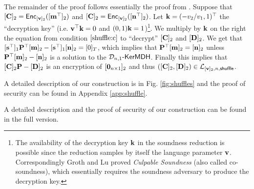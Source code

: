 The remainder of the proof follows essentially the proof from \cite{AC:GroLu07}. Suppose that $[\mathbf{{C}}]_2=\mathsf{Enc}_{[\mathbf{v}]_2}([\mathbf{{m}}^\top]_2)$ and $[\mathbf{{C}}]_2=\mathsf{Enc}_{[\mathbf{v}]_2}([\mathbf{{n}}^\top]_2)$. Let $\mathbf{k}=(-v_2/v_1,1)^\top$ the ``decryption key'' (i.e. $\mathbf{v}^\top\mathbf{k}=0$ and $(0,1)\mathbf{k}=1$)\footnote{The availability of the decryption key $\mathbf{k}$ in the soundness reduction is possible since the reduction samples by itself the language parameter $\mathbf{v}$. Correspondingly Groth and Lu \cite{AC:GroLu07} proved \emph{Culpable Soundness} (also called co-soundness), which essentially requires the soundness adversary to produce the decryption key.}. We multiply by $\mathbf{{k}}$ on the right the equation from condition $\ref{shuffle:c}$ to ``decrypt'' $[\mathbf{{C}}]_2$ and $[\mathbf{{D}}]_2$. We get that
$[\mathbf{s}^\top]_1\mathbf{{P}}^\top[\mathbf{{m}}]_2-[\mathbf{s}^\top]_1[\mathbf{{n}}]_2=[0]_T$, which implies that $\mathbf{{P}}^\top[\mathbf{{m}}]_2=[\mathbf{{n}}]_2$ unless $\mathbf{{P}}^\top[\mathbf{{m}}]_2-[\mathbf{{n}}]_2$ is a solution to the $\mathcal{D}_{n,1}\mbox{-}\mathsf{KerMDH}$. Finally this implies that $[\mathbf{{C}}]_2\mathbf{{P}}-[\mathbf{{D}}]_2$ is an encryption of $[\mathbf{{0}}_{n\times 1}]_2$ and thus $([\mathbf{{C}}]_2,[\mathbf{{D}}]_2)\in\mathcal{L}_{[\mathbf{v}]_2,n,\mathsf{shuffle}}$.

\iffull
A detailed description of our construction is in Fig. \ref{fig:shuffles} and the proof of security can be found in Appendix \ref{app:shuffle}.

\else
A detailed description and the proof of security of our construction can be found in the full version.
\fi
